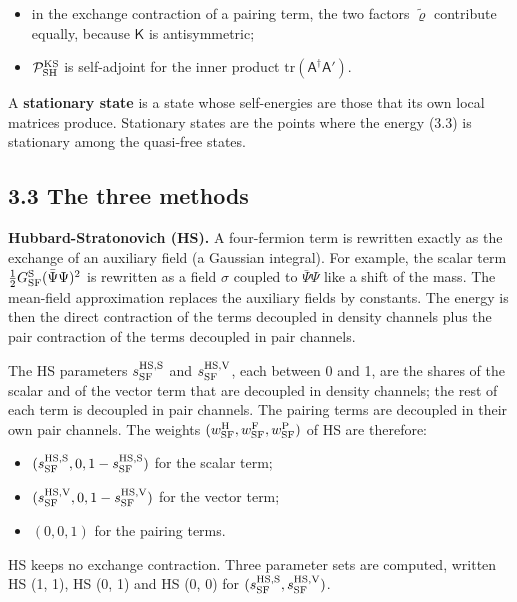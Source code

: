 \documentclass[
  10pt,
]{article}
\providecommand{\tightlist}{%
  \setlength{\itemsep}{0pt}\setlength{\parskip}{0pt}}
\begin{document}
\begin{itemize}
\tightlist
\item
  in the exchange contraction of a pairing term, the two factors
  \(\tilde\varrho\) contribute equally, because \(\mathsf K\) is
  antisymmetric;
\item
  \(\mathcal P^{\rm KS}_{\rm SH}\) is self-adjoint for the inner product
  \(\mathrm{tr}(\mathsf A^\dagger\mathsf A')\).
\end{itemize}

A \textbf{stationary state} is a state whose self-energies are those
that its own local matrices produce. Stationary states are the points
where the energy (3.3) is stationary among the quasi-free states.

\hypertarget{the-three-methods}{%
\subsection{3.3 The three methods}\label{the-three-methods}}

\textbf{Hubbard-Stratonovich (HS).} A four-fermion term is rewritten
exactly as the exchange of an auxiliary field (a Gaussian integral). For
example, the scalar term \(\tfrac12G^{\rm S}_{\rm SF}(\bar\Psi\Psi)^2\)
is rewritten as a field \(\sigma\) coupled to \(\bar\Psi\Psi\) like a
shift of the mass. The mean-field approximation replaces the auxiliary
fields by constants. The energy is then the direct contraction of the
terms decoupled in density channels plus the pair contraction of the
terms decoupled in pair channels.

The HS parameters \(s^{\rm HS,S}_{\rm SF}\) and
\(s^{\rm HS,V}_{\rm SF}\), each between 0 and 1, are the shares of the
scalar and of the vector term that are decoupled in density channels;
the rest of each term is decoupled in pair channels. The pairing terms
are decoupled in their own pair channels. The weights
\((w^{\rm H}_{\rm SF},w^{\rm F}_{\rm SF},w^{\rm P}_{\rm SF})\) of HS are
therefore:

\begin{itemize}
\tightlist
\item
  \((s^{\rm HS,S}_{\rm SF},0,1-s^{\rm HS,S}_{\rm SF})\) for the scalar
  term;
\item
  \((s^{\rm HS,V}_{\rm SF},0,1-s^{\rm HS,V}_{\rm SF})\) for the vector
  term;
\item
  \((0,0,1)\) for the pairing terms.
\end{itemize}

HS keeps no exchange contraction. Three parameter sets are computed,
written HS (1, 1), HS (0, 1) and HS (0, 0) for
\((s^{\rm HS,S}_{\rm SF},s^{\rm HS,V}_{\rm SF})\).
\end{document}
